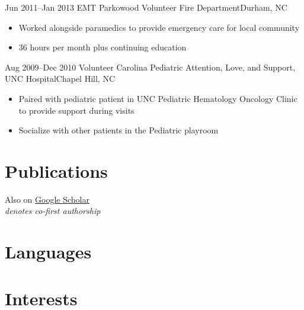 \documentclass[11pt,a4paper,sans]{moderncv} %
\begin{document}
        \cventry
            {Jun 2011--Jan 2013}
            {EMT}
            {Parkowood Volunteer Fire Department}{Durham, NC}{}
            {
                \begin{itemize}
                    \item Worked alongside paramedics to provide emergency care for local community
                    \item 36 hours per month plus continuing education
                \end{itemize}
            }
        \cventry
            {Aug 2009--Dec 2010}
            {Volunteer}
            {Carolina Pediatric Attention, Love, and Support, UNC Hospital}{Chapel Hill, NC}{}
            {
                \begin{itemize}
                    \item Paired with pediatric patient in UNC Pediatric Hematology Oncology Clinic to provide support during visits
                    \item Socialize with other patients in the Pediatric playroom
                \end{itemize}
            }

\section{Publications}
    Also on \href{https://scholar.google.com/citations?user=tcMs9UEAAAAJ&hl=en}{Google Scholar} \\
    \textsuperscript{\textbf{\textasteriskcentered}} \textit{denotes co-first authorship}

    


\section{Languages}



\section{Interests}

\renewcommand{\listitemsymbol}{-~} %


\end{document}
